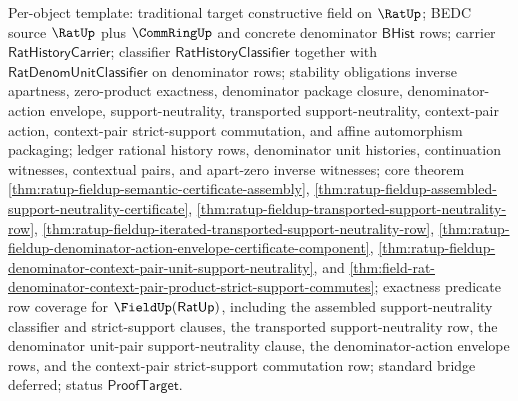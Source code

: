 Per-object template: traditional target constructive field on $\RatUp$; BEDC
source $\RatUp$ plus $\CommRingUp$ and concrete denominator $\mathsf{BHist}$
rows; carrier $\mathsf{RatHistoryCarrier}$; classifier
$\mathsf{RatHistoryClassifier}$ together with
$\mathsf{RatDenomUnitClassifier}$ on denominator rows; stability obligations
inverse apartness, zero-product exactness, denominator package closure,
denominator-action envelope, support-neutrality, transported support-neutrality,
context-pair action, context-pair strict-support commutation, and affine
automorphism packaging;
ledger rational history rows, denominator unit histories, continuation
witnesses, contextual pairs, and apart-zero inverse witnesses; core theorem
\autoref{thm:ratup-fieldup-semantic-certificate-assembly},
\autoref{thm:ratup-fieldup-assembled-support-neutrality-certificate},
\autoref{thm:ratup-fieldup-transported-support-neutrality-row},
\autoref{thm:ratup-fieldup-iterated-transported-support-neutrality-row},
\autoref{thm:ratup-fieldup-denominator-action-envelope-certificate-component},
\autoref{thm:ratup-fieldup-denominator-context-pair-unit-support-neutrality},
and
\autoref{thm:field-rat-denominator-context-pair-product-strict-support-commutes};
exactness predicate row coverage for $\FieldUp(\mathsf{RatUp})$, including the
assembled support-neutrality classifier and strict-support clauses, the
transported support-neutrality row, the denominator unit-pair
support-neutrality clause, the denominator-action envelope rows, and the
context-pair strict-support commutation row; standard bridge deferred; status
$\mathsf{ProofTarget}$.
